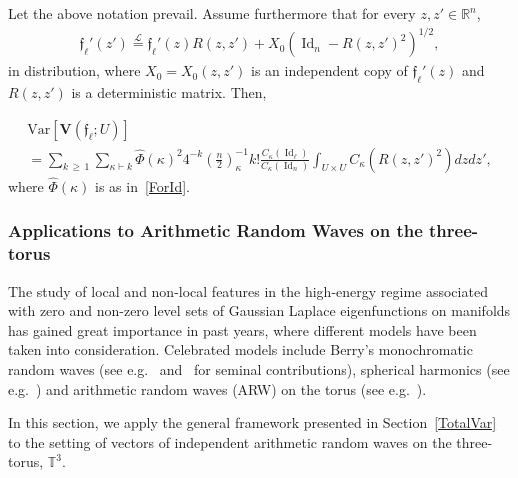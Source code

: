 \documentclass[AHL,Unicode,longabstracts,published]{cedram}
\DeclareMathOperator{\Id}{Id}
\newcommand{\bfv}{\mathbf{V}}
\newcommand{\frkf}{\mathfrak{f}}
\newcommand{\R}{\mathbb{R}}
\newcommand{\T}{\mathbb{T}^3}
\newcommand{\V}[1]{\mathrm{Var}{\left[#1\right]}}
\newcommand{\eqLaw}{ \overset{\mathcal{L}}{=} }
\begin{document}
\begin{prop}\label{VarTV}
Let the above notation prevail. Assume furthermore that for every $z,z'\in \R^n$,
\begin{gather}\label{CovMatrix}
\frkf_{\ell}'(z') \eqLaw\frkf_{\ell}'(z)R(z,z')+X_0\left(\Id_n-R(z,z')^2\right)^{1/2},
\end{gather}
in distribution, where $X_0=X_0(z,z')$ is an independent copy of $\frkf_{\ell}'(z)$ and $R(z,z') $ is a deterministic matrix. Then,

\begin{multline}\label{VarV}
\V{\bfv\left(\frkf_{\ell};U\right)} \\
= \sum_{k\,\geq\,1}\sum_{\kappa\vdash k} \widehat{\Phi}(\kappa)^2 4^{-k}\left(\frac{n}{2}\right)_{\kappa}^{-1} k !
\frac{C_{\kappa}(\Id_{\ell})}{C_{\kappa}(\Id_n)} \int_{U\times U} C_{\kappa}\left(R(z,z')^2\right) dz dz',
\end{multline}
where $\widehat{\Phi}(\kappa)$ is as in~\eqref{ForId}.
\end{prop}

\subsubsection{Applications to Arithmetic Random Waves on the three-torus}\label{SecARW}

The study of local and non-local features in the high-energy regime associated with zero and non-zero level sets of Gaussian Laplace eigenfunctions on manifolds has gained great importance in past years, where different models have been taken into consideration. Celebrated models include Berry's monochromatic random waves (see e.g.~\cite{DEL19,MPRW16,NPR17,PV20} and~\cite{Ber77,Ber02} for seminal contributions), spherical harmonics (see e.g.~\cite{CMW16b,CMW16,MP11,MRW17,Wig10}) and arithmetic random waves (ARW) on the torus (see e.g.~\cite{BM17,Cam17,
DNPR16,KKW13,
Not20,ORW08,PR16,RW08}).

In this section, we apply the general framework presented in Section~\ref{TotalVar} to the setting of vectors of independent arithmetic random waves on the three-torus, $\T$.

\end{document}
